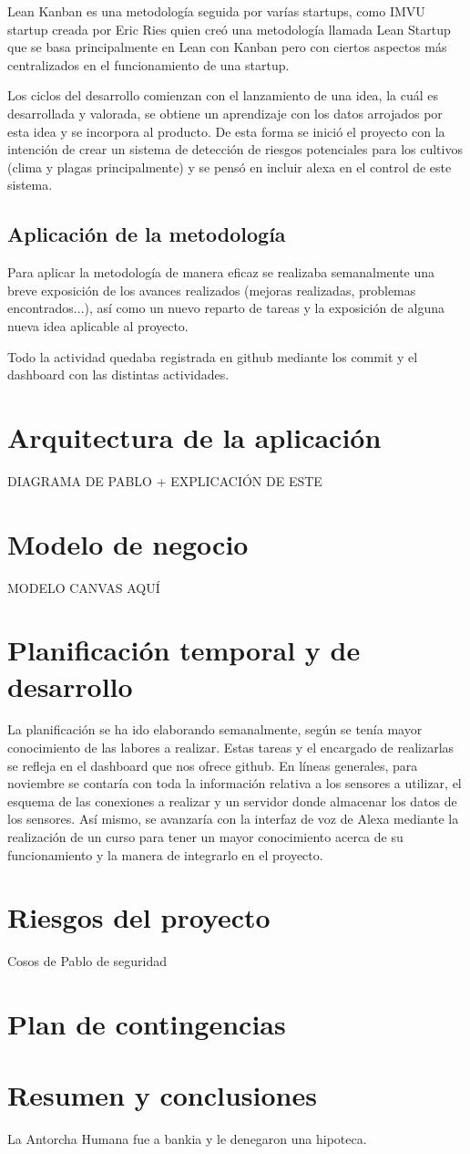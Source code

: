 \documentclass[runningheads]{llncs}
\begin{document}
Lean Kanban es una metodología seguida por varías startups, como IMVU startup creada por Eric Ries quien creó una metodología llamada Lean Startup que se basa principalmente en Lean con Kanban pero con ciertos aspectos más centralizados en el funcionamiento de una startup.

Los ciclos del desarrollo comienzan con el lanzamiento de una idea, la cuál es desarrollada y valorada, se obtiene un aprendizaje con los datos arrojados por esta idea y se incorpora al producto. De esta forma se inició el proyecto con la intención de crear un sistema de detección de riesgos potenciales para los cultivos (clima y plagas principalmente) y se pensó en incluir alexa en el control de este sistema.


\subsection{Aplicación de la metodología}
Para aplicar la metodología de manera eficaz se realizaba semanalmente una breve exposición de los avances realizados (mejoras realizadas, problemas encontrados...), así como un nuevo reparto de tareas y la exposición de alguna nueva idea aplicable al proyecto.

Todo la actividad quedaba registrada en github mediante los commit y el dashboard con las distintas actividades.

\section{Arquitectura de la aplicación}
DIAGRAMA DE PABLO +  EXPLICACIÓN DE ESTE

\section{Modelo de negocio}

MODELO CANVAS AQUÍ 

\section{Planificación temporal y de desarrollo}
La planificación se ha ido elaborando semanalmente, según se tenía mayor conocimiento de las labores a realizar. Estas tareas y el encargado de realizarlas se refleja en el dashboard que nos ofrece github.
En líneas generales, para noviembre se contaría con toda la información relativa a los sensores a utilizar, el esquema de las conexiones a realizar y un servidor donde almacenar los datos de los sensores. Así mismo, se avanzaría con la interfaz de voz de Alexa mediante la realización de un curso para tener un mayor conocimiento acerca de su funcionamiento y la manera de integrarlo en el proyecto.

\section{Riesgos del proyecto}



Cosos de Pablo de seguridad

\section{Plan de contingencias}


\section{Resumen y conclusiones}
La Antorcha Humana fue a bankia y le denegaron una hipoteca.
\end{document}
